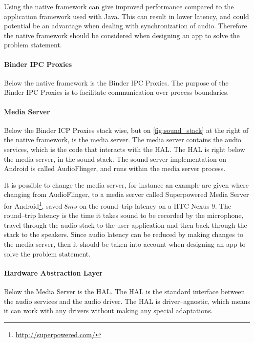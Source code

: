 Using the native framework can give improved performance compared to the application framework used with Java\cite{nat_perf_2}.
This can result in lower latency, and could potential be an advantage when dealing with synchronization of audio.
Therefore the native framework should be considered when designing an app to solve the problem statement.

\paragraph{Binder IPC Proxies}
Below the native framework is the Binder IPC Proxies.
The purpose of the Binder IPC Proxies is to facilitate communication over process boundaries.

\paragraph{Media Server}
Below the Binder ICP Proxies stack wise, but on \cref{fig:sound_stack} at the right of the native framework, is the media server.
The media server contains the audio services, which is the code that interacts with the \ac{HAL}.
The \ac{HAL} is right below the media server, in the sound stack.
The sound server implementation on Android is called AudioFlinger, and runs within the media server process\cite{audioflinger}.

It is possible to change the media server, 
for instance an example are given where changing from AudioFlinger, to a media server called Superpowered Media Server for Android\footnote{\url{http://superpowered.com/}}, saved $8 ms$ on the round--trip latency on a HTC Nexus 9\cite{superpowered_8ms}.
The round--trip latency is the time it takes sound to be recorded by the microphone,
travel through the audio stack to the user application and then back through the stack to the speakers\cite{superpowered_8ms}.
Since audio latency can be reduced by making changes to the media server,
then it should be taken into account when designing an app to solve the problem statement.

\paragraph{Hardware Abstraction Layer}
Below the Media Server is the \ac{HAL}.
The \ac{HAL} is the standard interface between the audio services and the audio driver.
The \ac{HAL} is driver--agnostic, which means it can work with any drivers without making any special adaptations.

